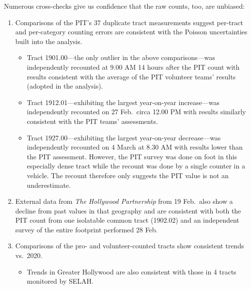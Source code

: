 \documentclass[11pt]{article}
\def\selah{SELAH}
\begin{document}
Numerous cross-checks give us confidence that the raw counts, too, are unbiased:
\begin{enumerate}
	\item Comparisons of the PIT's 37 duplicate tract measurements suggest per-tract and per-category
		counting errors are consistent with the Poisson uncertainties built into the analysis.
		\begin{itemize}
			\item Tract 1901.00---the only outlier in the above comparisons---was independently recounted 
				at 9.00 AM 14 hours after the PIT count with results consistent with the average 
				of the PIT volunteer teams' results (adopted in the analysis).
			\item Tract 1912.01---exhibiting the largest year-on-year increase---was independently recounted
				on 27 Feb.\ circa 12.00 PM with results similarly consistent with the PIT teams' assessments.
			\item Tract 1927.00---exhibiting the largest year-on-year decrease---was independently recounted
				on 4 March at 8.30 AM with results lower than the PIT assessment. However, the PIT
				survey was done on foot in this especially dense tract while the recount was done by a single
				counter in a vehicle. The recount therefore only suggests the PIT value is not an underestimate.
		\end{itemize}
	\item External data from {\it The Hollywood Partnership} from 19 Feb.\ also show a decline from past values 
		in that geography and are consistent with both the PIT count from one isolatable common tract 
		(1902.02) and an independent survey of the entire footprint performed 28 Feb.
	\item Comparisons of the pro- and volunteer-counted tracts show consistent trends vs.\ 2020.
		\begin{itemize}
			\item Trends in Greater Hollywood are also consistent with those in 4 tracts
				monitored by \selah.
		\end{itemize}
\end{enumerate}

%
%
%
\end{document}
